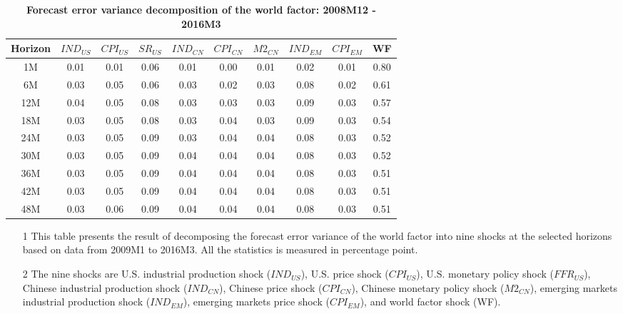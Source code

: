 \documentclass[12pt]{article}
\numberwithin{equation}{section}
\begin{document}
\begin{table}[htbp]
  \centering

\caption{\textbf{Forecast error variance decomposition of the world factor: 2008M12 - 2016M3}}
  \begin{tabularx}{\textwidth}{@{\extracolsep{\fill}}cccccccccc}
    \hline\hline
\multirow{1}{0.9cm}{Horizon}	&	\multirow{1}{0.9cm}{$IND_{US}$}	&	\multirow{1}{0.9cm}{$CPI_{US}$}	&	\multirow{1}{0.9cm}{$SR_{US}$}	&	\multirow{1}{0.9cm}{$IND_{CN}$}	&	\multirow{1}{0.9cm}{$CPI_{CN}$}	&	\multirow{1}{0.9cm}{$M2_{CN}$}	&	\multirow{1}{0.9cm}{$IND_{EM}$}	&	\multirow{1}{0.9cm}{$CPI_{EM}$}	&	\multirow{1}{0.9cm}{WF}	\\\hline
1M	&	0.01 	&	0.01 	&	0.06 	&	0.01 	&	0.00 	&	0.01 	&	0.02 	&	0.01 	&	0.80 	\\
6M	&	0.03 	&	0.05 	&	0.06 	&	0.03 	&	0.02 	&	0.03 	&	0.08 	&	0.02 	&	0.61 	\\
12M	&	0.04 	&	0.05 	&	0.08 	&	0.03 	&	0.03 	&	0.03 	&	0.09 	&	0.03 	&	0.57 	\\
18M	&	0.03 	&	0.05 	&	0.08 	&	0.03 	&	0.04 	&	0.03 	&	0.09 	&	0.03 	&	0.54 	\\
24M	&	0.03 	&	0.05 	&	0.09 	&	0.03 	&	0.04 	&	0.04 	&	0.08 	&	0.03 	&	0.52 	\\
30M	&	0.03 	&	0.05 	&	0.09 	&	0.04 	&	0.04 	&	0.04 	&	0.08 	&	0.03 	&	0.52 	\\
36M	&	0.03 	&	0.05 	&	0.09 	&	0.04 	&	0.04 	&	0.04 	&	0.08 	&	0.03 	&	0.51 	\\
42M	&	0.03 	&	0.05 	&	0.09 	&	0.04 	&	0.04 	&	0.04 	&	0.08 	&	0.03 	&	0.51 	\\
48M	&	0.03 	&	0.06 	&	0.09 	&	0.04 	&	0.04 	&	0.04 	&	0.08 	&	0.03 	&	0.51 	\\
\hline\hline
    \end{tabularx}%
  \label{tab:vd_after}%

   \begin{minipage}{\textwidth}
{			
    \begin{itemize}
\item[1] This table presents the result of decomposing the forecast error variance of the world factor into nine shocks at the selected horizons based on data from 2009M1 to 2016M3. All the statistics is measured in percentage point.
\item[2] The nine shocks are U.S. industrial production shock ($IND_{US}$), U.S. price shock ($CPI_{US}$), U.S. monetary policy shock ($FFR_{US}$), Chinese industrial production shock ($IND_{CN}$), Chinese price shock ($CPI_{CN}$), Chinese monetary policy shock ($M2_{CN}$), emerging markets industrial production shock ($IND_{EM}$), emerging markets price shock ($CPI_{EM}$), and world factor shock (WF).
\end{itemize}
}
\end{minipage}

\end{table}%
\end{document}
